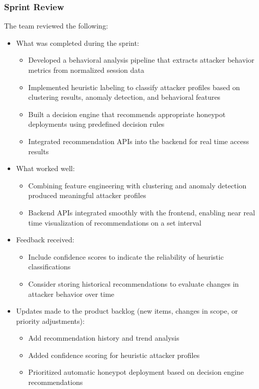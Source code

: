 \documentclass{article}
\begin{document}
\subsubsection{Sprint Review}
The team reviewed the following:

\begin{itemize}
    \item What was completed during the sprint:
    \begin{itemize}
        \item Developed a behavioral analysis pipeline that extracts attacker behavior metrics from normalized session data
        \item Implemented heuristic labeling to classify attacker profiles based on clustering results, anomaly detection, and behavioral features
        \item Built a decision engine that recommends appropriate honeypot deployments using predefined decision rules
        \item Integrated recommendation APIs into the backend for real time access results
    \end{itemize}
    \item What worked well:
     \begin{itemize}
        \item Combining feature engineering with clustering and anomaly detection produced meaningful attacker profiles
        \item Backend APIs integrated smoothly with the frontend, enabling near real time visualization of recommendations on a set interval
    \end{itemize}
    \item Feedback received:
    \begin{itemize}
        \item Include confidence scores to indicate the reliability of heuristic classifications
        \item Consider storing historical recommendations to evaluate changes in attacker behavior over time
    \end{itemize}
    \item Updates made to the product backlog (new items, changes in scope, or priority adjustments):
    \begin{itemize}
        \item Add recommendation history and trend analysis
        \item Added confidence scoring for heuristic attacker profiles
        \item Prioritized automatic honeypot deployment based on decision engine recommendations
    \end{itemize}
\end{itemize}
\end{document}
